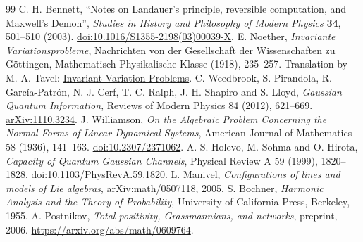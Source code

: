 \begin{thebibliography}{99}
 C. H. Bennett, ``Notes on Landauer's principle, reversible computation, and Maxwell's Demon'', \emph{Studies in History and Philosophy of Modern Physics} \textbf{34}, 501--510 (2003). \href{https://doi.org/10.1016/S1355-2198(03)00039-X}{doi:10.1016/S1355-2198(03)00039-X}.
 E. Noether, \emph{Invariante Variationsprobleme}, Nachrichten von der Gesellschaft der Wissenschaften zu Göttingen, Mathematisch-Physikalische Klasse (1918), 235--257. Translation by M. A. Tavel: \href{https://arxiv.org/abs/physics/0503066}{Invariant Variation Problems}.
 C. Weedbrook, S. Pirandola, R. García-Patrón, N. J. Cerf, T. C. Ralph, J. H. Shapiro and S. Lloyd, \emph{Gaussian Quantum Information}, Reviews of Modern Physics 84 (2012), 621--669. \href{https://arxiv.org/abs/1110.3234}{arXiv:1110.3234}.
 J. Williamson, \emph{On the Algebraic Problem Concerning the Normal Forms of Linear Dynamical Systems}, American Journal of Mathematics 58 (1936), 141--163. \href{https://doi.org/10.2307/2371062}{doi:10.2307/2371062}.
 A. S. Holevo, M. Sohma and O. Hirota, \emph{Capacity of Quantum Gaussian Channels}, Physical Review A 59 (1999), 1820--1828. \href{https://doi.org/10.1103/PhysRevA.59.1820}{doi:10.1103/PhysRevA.59.1820}.
 L. Manivel, \emph{Configurations of lines and models of Lie algebras}, arXiv:math/0507118, 2005.
 S. Bochner, \emph{Harmonic Analysis and the Theory of Probability}, University of California Press, Berkeley, 1955.
 A. Postnikov, \emph{Total positivity, Grassmannians, and networks},
preprint, 2006. \url{https://arxiv.org/abs/math/0609764}.
\end{thebibliography}
\endgroup
